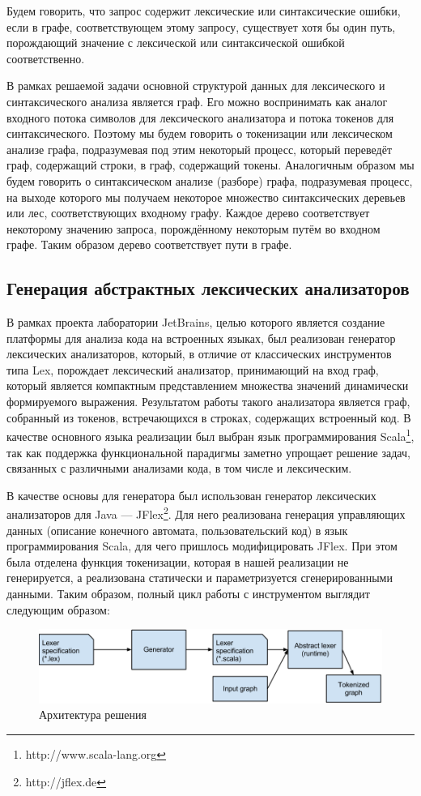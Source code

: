 Будем говорить, что запрос содержит лексические или синтаксические ошибки, 
если в графе, соответствующем этому запросу, существует хотя бы один путь, 
порождающий значение с лексической или синтаксической ошибкой соответственно.

В рамках решаемой задачи основной структурой данных для лексического и 
синтаксического анализа является граф. Его можно воспринимать как аналог 
входного потока символов для лексического анализатора и потока токенов для 
синтаксического. Поэтому мы будем говорить о токенизации или лексическом анализе 
графа, подразумевая под этим некоторый процесс, который переведёт граф, 
содержащий строки, в граф, содержащий токены. Аналогичным образом мы будем 
говорить о синтаксическом анализе (разборе) графа, подразумевая процесс, на 
выходе которого мы получаем некоторое множество синтаксических деревьев или лес, 
соответствующих входному графу. Каждое дерево соответствует некоторому значению 
запроса, порождённому некоторым путём во входном графе. Таким образом дерево 
соответствует пути в графе.

\subsection{Генерация абстрактных лексических анализаторов}
В рамках проекта лаборатории JetBrains, целью которого является создание 
платформы для анализа кода на встроенных языках, был реализован генератор 
лексических анализаторов, который, в отличие от классических инструментов типа 
Lex, порождает лексический анализатор, принимающий на вход граф, который 
является компактным представлением множества значений динамически формируемого 
выражения. Результатом работы такого анализатора является граф, собранный из 
токенов, встречающихся в строках, содержащих встроенный код. В качестве 
основного языка реализации был выбран язык программирования Scala\footnote{http://www.scala-lang.org}, так как 
поддержка функциональной парадигмы заметно упрощает решение задач, связанных с 
различными анализами кода, в том числе и лексическим.

В качестве основы для генератора был использован генератор лексических 
анализаторов для Java — JFlex\footnote{http://jflex.de}. Для него реализована генерация управляющих 
данных (описание конечного автомата, пользовательский код) в язык 
программирования Scala, для чего пришлось модифицировать JFlex. При этом была 
отделена функция токенизации, которая в нашей реализации не генерируется, а 
реализована статически и параметризуется сгенерированными данными. Таким образом, 
полный цикл работы с инструментом выглядит следующим образом:
\begin{figure}[h]
 \label{Arch}
 \centering
 \includegraphics[width=15cm]{Verbitskaya/AL_base_arch.png}
 \caption{Архитектура решения}
 \label{Arch}
\end{figure}


